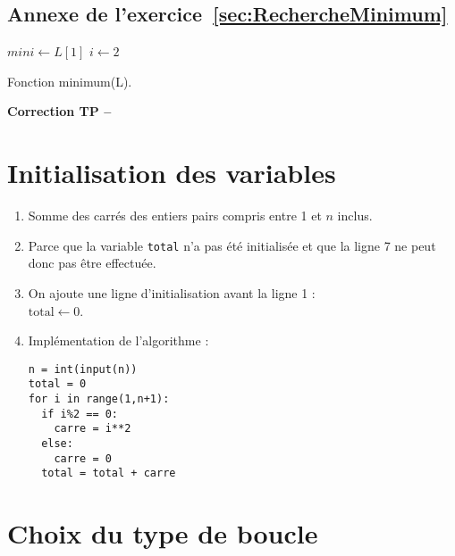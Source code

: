 \subsection*{Annexe de l'exercice~\ref{sec:RechercheMinimum}}
\begin{algorithm}[H]
$mini \leftarrow L[1]$ \;
$i \leftarrow 2$ \;
\caption{Fonction minimum(L).}
\label{algo:recherchetantque}
\end{algorithm}

\ifdef{\public}{}{}
\cleardoublepage
\renewcommand{\type}{Correction TP}
\setcounter{section}{0}
\begin{center}
{\Large\bf {\type} \no {\num} -- \descrip}
\end{center}


\section{Initialisation des variables}

\begin{enumerate}
 \item Somme des carrés des entiers pairs compris entre 1 et $n$ inclus.
 
 \item Parce que la variable \texttt{total} n'a pas été initialisée et que la ligne 7 ne peut donc pas être effectuée.
 
 \item On ajoute une ligne d'initialisation avant la ligne 1 :\\
 $\text{total} \leftarrow 0$.
 
 \item Implémentation de l'algorithme :
 
\begin{verbatim}
n = int(input(n))
total = 0
for i in range(1,n+1):
  if i%2 == 0:
    carre = i**2
  else:
    carre = 0
  total = total + carre
\end{verbatim}
 
\end{enumerate}

\section{Choix du type de boucle}


